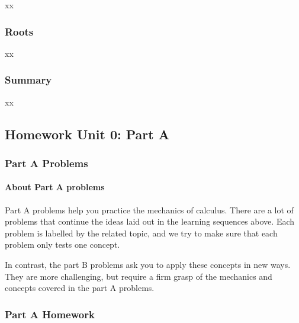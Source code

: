 \documentclass[pdftex, brazil, 12pt, twoside]{article}
\begin{document}
xx

\subsubsection{Roots}
\label{u0-cont-roots}

xx

\subsubsection{Summary}
\label{u0-cont-summary}

xx


\subsection{Homework Unit 0: Part A}
\label{u0-hw-pA}

\subsubsection{Part A Problems}
\label{u0-hw-pA-problems}

\paragraph{About Part A problems} Part A problems help you practice the mechanics
of calculus. There are a lot of problems that continue the ideas laid out in the
learning sequences above. Each problem is labelled by the related topic, and we
try to make sure that each problem only tests one concept.

In contrast, the part B problems ask you to apply these concepts in new ways.
They are more challenging, but require a firm grasp of the mechanics and concepts
covered in the part A problems.

\subsubsection{Part A Homework}
\label{u0-hw-pA-homework}
\end{document}
